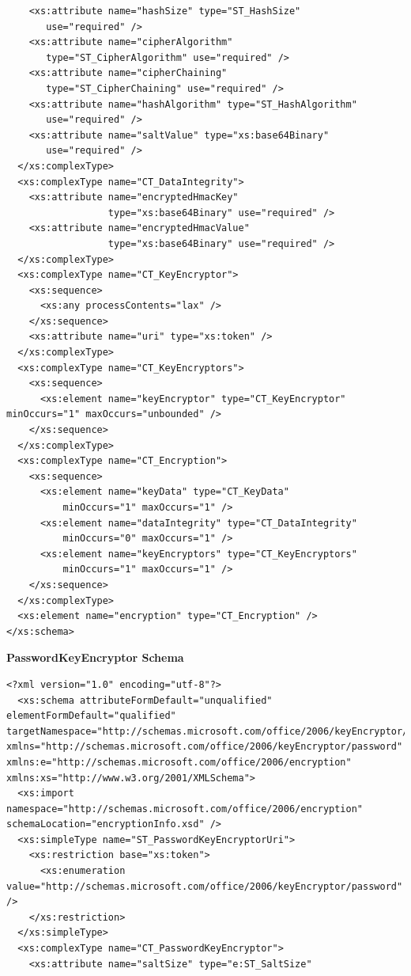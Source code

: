 \documentclass[11pt,oneside]{fithesis2}
\begin{document}
\begin{appendix}
\begin{lstlisting}
    <xs:attribute name="hashSize" type="ST_HashSize"
       use="required" /> 
    <xs:attribute name="cipherAlgorithm" 
       type="ST_CipherAlgorithm" use="required" /> 
    <xs:attribute name="cipherChaining"
       type="ST_CipherChaining" use="required" /> 
    <xs:attribute name="hashAlgorithm" type="ST_HashAlgorithm"
       use="required" /> 
    <xs:attribute name="saltValue" type="xs:base64Binary" 
       use="required" /> 
  </xs:complexType>
  <xs:complexType name="CT_DataIntegrity"> 
    <xs:attribute name="encryptedHmacKey" 
                  type="xs:base64Binary" use="required" /> 
    <xs:attribute name="encryptedHmacValue" 
                  type="xs:base64Binary" use="required" /> 
  </xs:complexType>
  <xs:complexType name="CT_KeyEncryptor"> 
    <xs:sequence>
      <xs:any processContents="lax" /> 
    </xs:sequence>
    <xs:attribute name="uri" type="xs:token" /> 
  </xs:complexType>
  <xs:complexType name="CT_KeyEncryptors"> 
    <xs:sequence>
      <xs:element name="keyEncryptor" type="CT_KeyEncryptor" minOccurs="1" maxOccurs="unbounded" /> 
    </xs:sequence>
  </xs:complexType>
  <xs:complexType name="CT_Encryption"> 
    <xs:sequence>
      <xs:element name="keyData" type="CT_KeyData" 
          minOccurs="1" maxOccurs="1" /> 
      <xs:element name="dataIntegrity" type="CT_DataIntegrity" 
          minOccurs="0" maxOccurs="1" /> 
      <xs:element name="keyEncryptors" type="CT_KeyEncryptors"
          minOccurs="1" maxOccurs="1" /> 
    </xs:sequence>
  </xs:complexType>
  <xs:element name="encryption" type="CT_Encryption" /> 
</xs:schema>
	\end{lstlisting}
\textbf{PasswordKeyEncryptor Schema}\label{ei_password_encryptor}
	\begin{lstlisting}
<?xml version="1.0" encoding="utf-8"?>
  <xs:schema attributeFormDefault="unqualified" elementFormDefault="qualified" targetNamespace="http://schemas.microsoft.com/office/2006/keyEncryptor/password" xmlns="http://schemas.microsoft.com/office/2006/keyEncryptor/password" xmlns:e="http://schemas.microsoft.com/office/2006/encryption" xmlns:xs="http://www.w3.org/2001/XMLSchema"> 
  <xs:import namespace="http://schemas.microsoft.com/office/2006/encryption" schemaLocation="encryptionInfo.xsd" /> 
  <xs:simpleType name="ST_PasswordKeyEncryptorUri"> 
    <xs:restriction base="xs:token">
      <xs:enumeration value="http://schemas.microsoft.com/office/2006/keyEncryptor/password" />
    </xs:restriction>
  </xs:simpleType> 
  <xs:complexType name="CT_PasswordKeyEncryptor">
    <xs:attribute name="saltSize" type="e:ST_SaltSize" 

\end{lstlisting}
\end{appendix}
\end{document}
